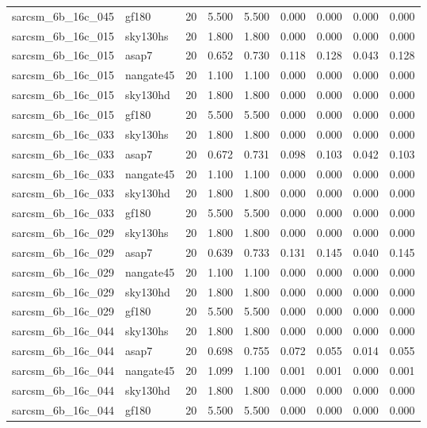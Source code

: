 \begin{tabular}{llrrrrrrr}
sarcsm\_6b\_16c\_045 & gf180 & 20 & 5.500 & 5.500 & 0.000 & 0.000 & 0.000 & 0.000 \\
sarcsm\_6b\_16c\_015 & sky130hs & 20 & 1.800 & 1.800 & 0.000 & 0.000 & 0.000 & 0.000 \\
sarcsm\_6b\_16c\_015 & asap7 & 20 & 0.652 & 0.730 & 0.118 & 0.128 & 0.043 & 0.128 \\
sarcsm\_6b\_16c\_015 & nangate45 & 20 & 1.100 & 1.100 & 0.000 & 0.000 & 0.000 & 0.000 \\
sarcsm\_6b\_16c\_015 & sky130hd & 20 & 1.800 & 1.800 & 0.000 & 0.000 & 0.000 & 0.000 \\
sarcsm\_6b\_16c\_015 & gf180 & 20 & 5.500 & 5.500 & 0.000 & 0.000 & 0.000 & 0.000 \\
sarcsm\_6b\_16c\_033 & sky130hs & 20 & 1.800 & 1.800 & 0.000 & 0.000 & 0.000 & 0.000 \\
sarcsm\_6b\_16c\_033 & asap7 & 20 & 0.672 & 0.731 & 0.098 & 0.103 & 0.042 & 0.103 \\
sarcsm\_6b\_16c\_033 & nangate45 & 20 & 1.100 & 1.100 & 0.000 & 0.000 & 0.000 & 0.000 \\
sarcsm\_6b\_16c\_033 & sky130hd & 20 & 1.800 & 1.800 & 0.000 & 0.000 & 0.000 & 0.000 \\
sarcsm\_6b\_16c\_033 & gf180 & 20 & 5.500 & 5.500 & 0.000 & 0.000 & 0.000 & 0.000 \\
sarcsm\_6b\_16c\_029 & sky130hs & 20 & 1.800 & 1.800 & 0.000 & 0.000 & 0.000 & 0.000 \\
sarcsm\_6b\_16c\_029 & asap7 & 20 & 0.639 & 0.733 & 0.131 & 0.145 & 0.040 & 0.145 \\
sarcsm\_6b\_16c\_029 & nangate45 & 20 & 1.100 & 1.100 & 0.000 & 0.000 & 0.000 & 0.000 \\
sarcsm\_6b\_16c\_029 & sky130hd & 20 & 1.800 & 1.800 & 0.000 & 0.000 & 0.000 & 0.000 \\
sarcsm\_6b\_16c\_029 & gf180 & 20 & 5.500 & 5.500 & 0.000 & 0.000 & 0.000 & 0.000 \\
sarcsm\_6b\_16c\_044 & sky130hs & 20 & 1.800 & 1.800 & 0.000 & 0.000 & 0.000 & 0.000 \\
sarcsm\_6b\_16c\_044 & asap7 & 20 & 0.698 & 0.755 & 0.072 & 0.055 & 0.014 & 0.055 \\
sarcsm\_6b\_16c\_044 & nangate45 & 20 & 1.099 & 1.100 & 0.001 & 0.001 & 0.000 & 0.001 \\
sarcsm\_6b\_16c\_044 & sky130hd & 20 & 1.800 & 1.800 & 0.000 & 0.000 & 0.000 & 0.000 \\
sarcsm\_6b\_16c\_044 & gf180 & 20 & 5.500 & 5.500 & 0.000 & 0.000 & 0.000 & 0.000 \\

\end{tabular}
